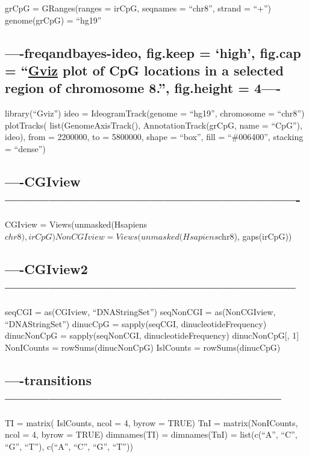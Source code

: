 \documentclass[]{article}
\begin{document}
grCpG = GRanges(ranges = irCpG, seqnames = ``chr8'', strand = ``+'')
genome(grCpG) = ``hg19''

\subsection{\texorpdfstring{----freqandbayes-ideo, fig.keep = `high',
fig.cap =
``\textbf{\href{https://bioconductor.org/packages/Gviz/}{Gviz}} plot of
CpG locations in a selected region of chromosome 8.'', fig.height =
4----}{----freqandbayes-ideo, fig.keep = high, fig.cap = Gviz plot of CpG locations in a selected region of chromosome 8., fig.height = 4----}}\label{freqandbayes-ideo-fig.keep-high-fig.cap-gviz-plot-of-cpg-locations-in-a-selected-region-of-chromosome-8.-fig.height-4-}

library(``Gviz'') ideo = IdeogramTrack(genome = ``hg19'', chromosome =
``chr8'') plotTracks( list(GenomeAxisTrack(), AnnotationTrack(grCpG,
name = ``CpG''), ideo), from = 2200000, to = 5800000, shape = ``box'',
fill = ``\#006400'', stacking = ``dense'')

\subsection{----CGIview-------------------------------------------------------------}\label{cgiview-}

CGIview =
Views(unmasked(Hsapiens\(chr8), irCpG) NonCGIview = Views(unmasked(Hsapiens\)chr8),
gaps(irCpG))

\subsection{----CGIview2------------------------------------------------------------}\label{cgiview2}

seqCGI = as(CGIview, ``DNAStringSet'') seqNonCGI = as(NonCGIview,
``DNAStringSet'') dinucCpG = sapply(seqCGI, dinucleotideFrequency)
dinucNonCpG = sapply(seqNonCGI, dinucleotideFrequency) dinucNonCpG{[},
1{]} NonICounts = rowSums(dinucNonCpG) IslCounts = rowSums(dinucCpG)

\subsection{----transitions---------------------------------------------------------}\label{transitions}

TI = matrix( IslCounts, ncol = 4, byrow = TRUE) TnI = matrix(NonICounts,
ncol = 4, byrow = TRUE) dimnames(TI) = dimnames(TnI) = list(c(``A'',
``C'', ``G'', ``T''), c(``A'', ``C'', ``G'', ``T''))
\end{document}
